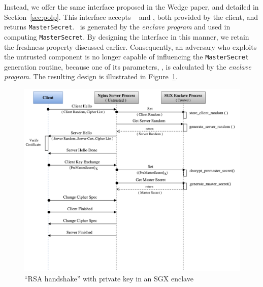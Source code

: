 \documentclass[../../main.tex]{subfiles}
\begin{document}
Instead, we offer the same interface proposed in the Wedge paper, and
detailed in Section~\ref{sec:polp}. This interface accepts \crandom~
and \premaster, both provided by the client, and returns
\texttt{MasterSecret}. \srandom~is generated by the \textit{enclave
  program} and used in computing \texttt{MasterSecret}. By designing
the interface in this manner, we retain the freshness property
discussed earlier. Consequently, an adversary who exploits the
untrusted component is no longer capable of influencing the
\texttt{MasterSecret} generation routine, because one of its
parameters, \srandom, is calculated by the \textit{enclave program}.
The resulting design is illustrated in Figure~\ref{fig:rsa-enc}.

\begin{figure}[H]
  \centering
  \includegraphics[scale=0.35]{images/RSA-SGX-Handshake.pdf}
  \caption[``RSA handshake'' and enclave]{``RSA handshake'' with
    private key in an SGX enclave}
  \label{fig:rsa-enc}
\end{figure}
\end{document}
